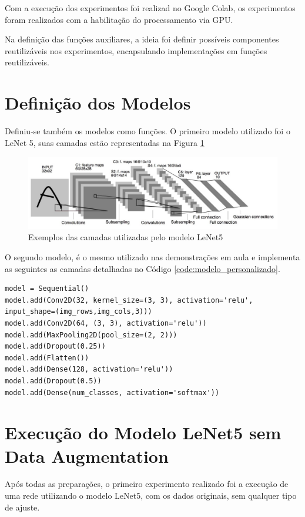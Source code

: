 \documentclass[12pt]{article}
\begin{document}
Com a execução dos experimentos foi realizad no Google Colab, os experimentos foram realizados com a habilitação do processamento via GPU.

Na definição das funções auxiliares, a ideia foi definir possíveis componentes reutilizáveis nos experimentos, encapsulando implementações em funções reutilizáveis.

\section{Definição dos Modelos}

Definiu-se também os modelos como funções. O primeiro modelo utilizado foi o LeNet 5, suas camadas estão representadas na Figura \ref{fig:image_lenet}

\begin{figure}[!htb]
  \centering
  \includegraphics[width=35em]{images/image_lenet.jpeg}
  \caption{Exemplos das camadas utilizadas pelo modelo LeNet5}
  \label{fig:image_lenet}
\end{figure}

O segundo modelo, é o mesmo utilizado nas demonstrações em aula e  implementa as seguintes as camadas detalhadas no Código \ref{code:modelo_personalizado}.

\begin{lstlisting}[caption={Modelo Personalizado},captionpos=b,frame=single,label={code:modelo_personalizado}]
model = Sequential()
model.add(Conv2D(32, kernel_size=(3, 3), activation='relu', input_shape=(img_rows,img_cols,3)))
model.add(Conv2D(64, (3, 3), activation='relu'))
model.add(MaxPooling2D(pool_size=(2, 2)))
model.add(Dropout(0.25))
model.add(Flatten())
model.add(Dense(128, activation='relu'))
model.add(Dropout(0.5))
model.add(Dense(num_classes, activation='softmax'))
\end{lstlisting}

\section{Execução do Modelo LeNet5 sem Data Augmentation}

Após todas as preparações, o primeiro experimento realizado foi a execução de uma rede utilizando o modelo LeNet5, com os dados originais, sem qualquer tipo de ajuste.
\end{document}
